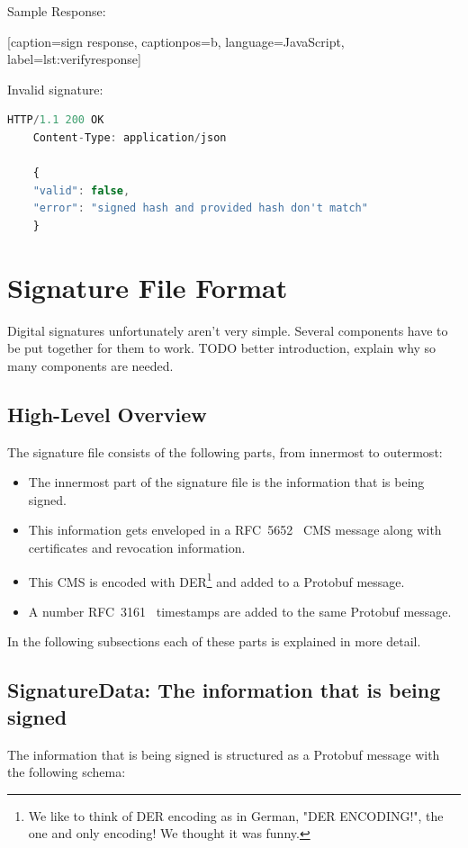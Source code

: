 Sample Response:

[caption={sign response}, captionpos=b, language=JavaScript, label={lst:verifyresponse}]

Invalid signature:

\begin{lstlisting}[caption={sign response}, captionpos=b, language=JavaScript, label={lst:verifyresponsefailed}]
    HTTP/1.1 200 OK
    Content-Type: application/json

    {
    "valid": false,
    "error": "signed hash and provided hash don't match"
    }
\end{lstlisting}

\section{Signature File Format}\label{sec:signature-file-format}
Digital signatures unfortunately aren't very simple.
Several components have to be put together for them to work.
TODO better introduction, explain why so many components are needed.
\subsection{High-Level Overview}\label{subsec:high-level-overview}
The signature file consists of the following parts, from innermost to outermost:

\begin{itemize}
    \item The innermost part of the signature file is the information that is being signed.
    \item This information gets enveloped in a RFC~5652~\cite{rfc5652} \gls{CMS} message along with certificates and revocation information.
    \item This \gls{CMS} is encoded with \gls{DER}\footnote{We like to think of DER encoding as in German, "DER ENCODING!", the one and only encoding! We thought it was funny.} and added to a Protobuf message.
    \item A number RFC~3161~\cite{rfc3161} timestamps are added to the same Protobuf message.
\end{itemize}

In the following subsections each of these parts is explained in more detail.

\subsection{SignatureData: The information that is being signed}\label{subsec:signaturedata:-the-information-that-is-being-signed}
The information that is being signed is structured as a Protobuf message with the following schema:

